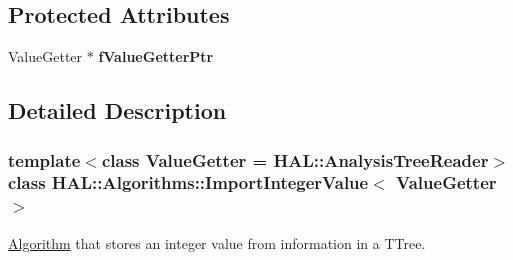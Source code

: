 \subsection*{Protected Attributes}
\begin{DoxyCompactItemize}
\item 
\hypertarget{class_h_a_l_1_1_algorithms_1_1_import_integer_value_af6ad5771bb63a3e813583f428095e831}{Value\+Getter $\ast$ {\bfseries f\+Value\+Getter\+Ptr}}\label{class_h_a_l_1_1_algorithms_1_1_import_integer_value_af6ad5771bb63a3e813583f428095e831}

\end{DoxyCompactItemize}


\subsection{Detailed Description}
\subsubsection*{template$<$class Value\+Getter = H\+A\+L\+::\+Analysis\+Tree\+Reader$>$class H\+A\+L\+::\+Algorithms\+::\+Import\+Integer\+Value$<$ Value\+Getter $>$}

\hyperlink{class_h_a_l_1_1_algorithm}{Algorithm} that stores an integer value from information in a T\+Tree. 

